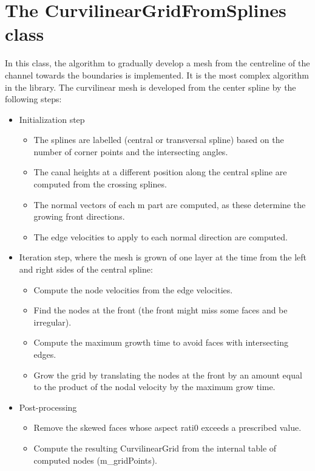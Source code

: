 \documentclass[biblatex]{deltares_manual}
\begin{document}
\chapter{The CurvilinearGridFromSplines class}

In this class, the algorithm to gradually develop a mesh from the centreline of the channel towards the boundaries is implemented. It is the most complex algorithm in the library. The curvilinear mesh is developed from the center spline by the following steps:
\begin{itemize}
\item Initialization step
\begin{itemize}
\item The splines are labelled (central or transversal spline) based on the number of corner points and the intersecting angles.
\item The canal heights at a different position along the central spline are computed from the crossing splines.
\item The normal vectors of each m part are computed, as these determine the growing front directions.
\item The edge velocities to apply to each normal direction are computed.
\end{itemize}
\item Iteration step, where the mesh is grown of one layer at the time from the left and right sides of the central spline:
\begin{itemize}
\item Compute the node velocities from the edge velocities.
\item Find the nodes at the front (the front might miss some faces and be irregular).
\item Compute the maximum growth time to avoid faces with intersecting edges.
\item Grow the grid by translating the nodes at the front by an amount equal to the product of the nodal velocity by the maximum grow time.
\end{itemize}
\item Post-processing
\begin{itemize}
\item Remove the skewed faces whose aspect rati0 exceeds a prescribed value.
\item Compute the resulting CurvilinearGrid from the internal table of computed nodes (m\_gridPoints).
\end{itemize}
\end{itemize}
\end{document}
